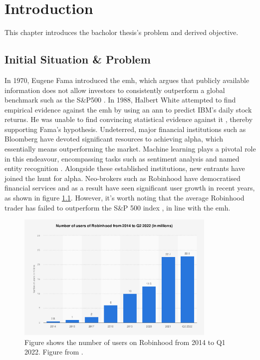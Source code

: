 \chapter{Introduction}
\label{ch:Introduction}
This chapter introduces the bacholor thesis's problem and derived objective.

\section{Initial Situation \& Problem}
\label{sec:InitialSituation}
In 1970, Eugene Fama introduced the \gls{emh}, which argues that publicly available information does not allow investors to consistently outperform a global benchmark such as the S\&P500 \citep{fama1970efficient}. In 1988, Halbert White attempted to find empirical evidence against the \gls{emh} by using an \gls{ann} to predict IBM's daily stock returns. He was unable to find convincing statistical evidence against it \citep{white1988economic}, thereby supporting Fama's hypothesis.
\newline
\newline
Undeterred, major financial institutions such as Bloomberg have devoted significant resources to achieving alpha, which essentially means outperforming the market. Machine learning plays a pivotal role in this endeavour, encompassing tasks such as sentiment analysis and named entity recognition \citep{wu2023bloomberggpt}.
\newline
\newline
Alongside these established institutions, new entrants have joined the hunt for alpha. Neo-brokers such as Robinhood have democratised financial services and as a result have seen significant user growth in recent years, as shown in figure \ref{fig:users_RH}. However, it's worth noting that the average Robinhood trader has failed to outperform the S\&P 500 index \citep{canellis-2020}, in line with the \gls{emh}.

\begin{figure}[ht]
    \centering
    \includegraphics[width=0.85\textwidth]{./assets/img/users_rh.png}
    \caption{Figure shows the number of users on Robinhood from 2014 to Q1 2022. Figure from \cite{statista_robinhood}.}
    \label{fig:users_RH}
\end{figure}

